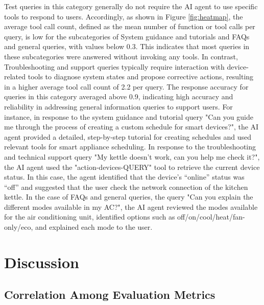 \documentclass[final,3p,times]{elsarticle}
\begin{document}
Test queries in this category generally do not require the AI agent to use specific tools to respond to users. Accordingly, as shown in Figure \ref{fig:heatmap}, the average tool call count, defined as the mean number of function or tool calls per query, is low for the subcategories of System guidance and tutorials and FAQs and general queries, with values below 0.3. This indicates that most queries in these subcategories were answered without invoking any tools. In contrast, Troubleshooting and support queries typically require interaction with device-related tools to diagnose system states and propose corrective actions, resulting in a higher average tool call count of 2.2 per query. The response accuracy for queries in this category averaged above 0.9, indicating high accuracy and reliability in addressing general information queries to support users. For instance, in response to the system guidance and tutorial query "Can you guide me through the process of creating a custom schedule for smart devices?", the AI agent provided a detailed, step-by-step tutorial for creating schedules and used relevant tools for smart appliance scheduling. In response to the troubleshooting and technical support query "My kettle doesn't work, can you help me check it?", the AI agent used the "action-devices-QUERY" tool to retrieve the current device status. In this case, the agent identified that the device’s “online” status was “off” and suggested that the user check the network connection of the kitchen kettle. In the case of FAQs and general queries, the query "Can you explain the different modes available in my AC?", the AI agent reviewed the modes available for the air conditioning unit, identified options such as off/on/cool/heat/fan-only/eco, and explained each mode to the user.

\section{Discussion}
\label{sec:discussion}

\subsection{Correlation Among Evaluation Metrics}
\end{document}
